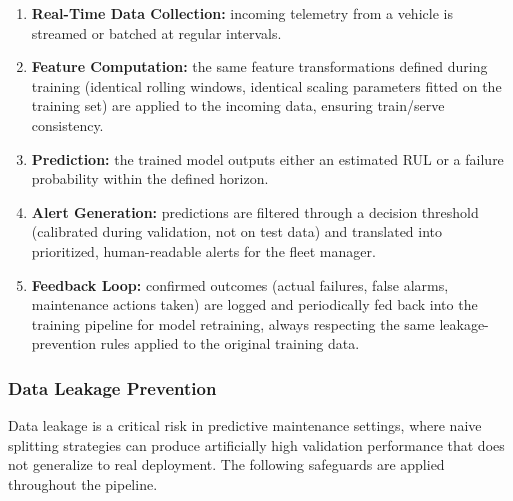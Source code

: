 \documentclass[11pt,a4paper]{article}
\begin{document}
\begin{enumerate}
    \item \textbf{Real-Time Data Collection:} incoming telemetry from a vehicle is streamed or batched at regular intervals.
    \item \textbf{Feature Computation:} the same feature transformations defined during training (identical rolling windows, identical scaling parameters fitted on the training set) are applied to the incoming data, ensuring train/serve consistency.
    \item \textbf{Prediction:} the trained model outputs either an estimated RUL or a failure probability within the defined horizon.
    \item \textbf{Alert Generation:} predictions are filtered through a decision threshold (calibrated during validation, not on test data) and translated into prioritized, human-readable alerts for the fleet manager.
    \item \textbf{Feedback Loop:} confirmed outcomes (actual failures, false alarms, maintenance actions taken) are logged and periodically fed back into the training pipeline for model retraining, always respecting the same leakage-prevention rules applied to the original training data.
\end{enumerate}

\subsubsection{Data Leakage Prevention}
\label{sec:leakage}

\noindent Data leakage is a critical risk in predictive maintenance settings, where naive splitting strategies can produce artificially high validation performance that does not generalize to real deployment. The following safeguards are applied throughout the pipeline.
\end{document}
